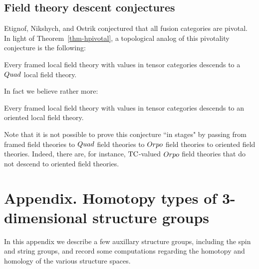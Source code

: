 \documentclass{amsart}
\begin{document}



\subsection{Field theory descent conjectures}

Etignof, Nikshych, and Ostrik conjectured that all fusion categories are pivotal.  In light of Theorem~\ref{thm-hpivotal}, a topological analog of this pivotality conjecture is the following:
\begin{conjecture}
Every framed local field theory with values in tensor categories descends to a $Quad$ local field theory.
\end{conjecture}
In fact we believe rather more:
\begin{conjecture}
Every framed local field theory with values in tensor categories descends to an oriented local field theory.
\end{conjecture}
Note that it is not possible to prove this conjecture ``in stages" by passing from framed field theories to $Quad$ field theories to $Orpo$ field theories to oriented field theories.  Indeed, there are, for instance, $\mathrm{TC}$-valued $Orpo$ field theories that do not descend to oriented field theories.  \CDcomm{[Right?]}


\appendix

\renewcommand{\thetheorem}{A.\arabic{theorem}}
\setcounter{theorem}{0}
\section*{Appendix.  Homotopy types of 3-dimensional structure groups}

In this appendix we describe a few auxillary structure groups, including the spin and string groups, and record some computations regarding the homotopy and homology of the various structure spaces.
\end{document}
